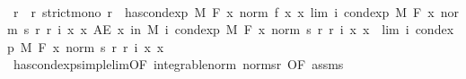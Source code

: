 \begin{isabellebody}
\ \ \isanewline
\ \ \isamarkupfalse%
\ r{\isacharprime}{\kern0pt}\ \ r{\isacharprime}{\kern0pt}{\isacharcolon}{\kern0pt}\ {\isachardoublequoteopen}strict{\isacharunderscore}{\kern0pt}mono\ r{\isacharprime}{\kern0pt}{\isachardoublequoteclose}\ \ {\isachardoublequoteopen}has{\isacharunderscore}{\kern0pt}cond{\isacharunderscore}{\kern0pt}exp\ M\ F\ {\isacharparenleft}{\kern0pt}{\isasymlambda}x{\isachardot}{\kern0pt}\ norm\ {\isacharparenleft}{\kern0pt}f\ x{\isacharparenright}{\kern0pt}{\isacharparenright}{\kern0pt}\ {\isacharparenleft}{\kern0pt}{\isasymlambda}x{\isachardot}{\kern0pt}\ lim\ {\isacharparenleft}{\kern0pt}{\isasymlambda}i{\isachardot}{\kern0pt}\ cond{\isacharunderscore}{\kern0pt}exp\ M\ F\ {\isacharparenleft}{\kern0pt}{\isasymlambda}x{\isachardot}{\kern0pt}\ norm\ {\isacharparenleft}{\kern0pt}s\ {\isacharparenleft}{\kern0pt}r\ {\isacharparenleft}{\kern0pt}r{\isacharprime}{\kern0pt}\ i{\isacharparenright}{\kern0pt}{\isacharparenright}{\kern0pt}\ x{\isacharparenright}{\kern0pt}{\isacharparenright}{\kern0pt}\ x{\isacharparenright}{\kern0pt}{\isacharparenright}{\kern0pt}{\isachardoublequoteclose}\ {\isachardoublequoteopen}AE\ x\ in\ M{\isachardot}{\kern0pt}\ {\isacharparenleft}{\kern0pt}{\isasymlambda}i{\isachardot}{\kern0pt}\ cond{\isacharunderscore}{\kern0pt}exp\ M\ F\ {\isacharparenleft}{\kern0pt}{\isasymlambda}x{\isachardot}{\kern0pt}\ norm\ {\isacharparenleft}{\kern0pt}s\ {\isacharparenleft}{\kern0pt}r\ {\isacharparenleft}{\kern0pt}r{\isacharprime}{\kern0pt}\ i{\isacharparenright}{\kern0pt}{\isacharparenright}{\kern0pt}\ x{\isacharparenright}{\kern0pt}{\isacharparenright}{\kern0pt}\ x{\isacharparenright}{\kern0pt}\ {\isasymlonglonglongrightarrow}\ lim\ {\isacharparenleft}{\kern0pt}{\isasymlambda}i{\isachardot}{\kern0pt}\ cond{\isacharunderscore}{\kern0pt}exp\ M\ F\ {\isacharparenleft}{\kern0pt}{\isasymlambda}x{\isachardot}{\kern0pt}\ norm\ {\isacharparenleft}{\kern0pt}s\ {\isacharparenleft}{\kern0pt}r\ {\isacharparenleft}{\kern0pt}r{\isacharprime}{\kern0pt}\ i{\isacharparenright}{\kern0pt}{\isacharparenright}{\kern0pt}\ x{\isacharparenright}{\kern0pt}{\isacharparenright}{\kern0pt}\ x{\isacharparenright}{\kern0pt}{\isachardoublequoteclose}\ \isamarkupfalse%
\ has{\isacharunderscore}{\kern0pt}cond{\isacharunderscore}{\kern0pt}exp{\isacharunderscore}{\kern0pt}simple{\isacharunderscore}{\kern0pt}lim{\isacharbrackleft}{\kern0pt}OF\ integrable{\isacharunderscore}{\kern0pt}norm\ norm{\isacharunderscore}{\kern0pt}s{\isacharunderscore}{\kern0pt}r{\isacharcomma}{\kern0pt}\ OF\ assms{\isacharbrackright}{\kern0pt}\ \isamarkupfalse%

\end{isabellebody}
